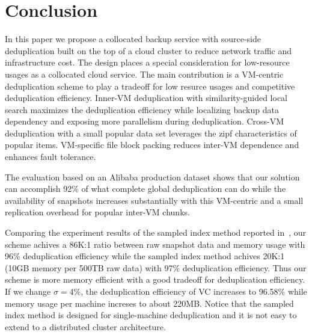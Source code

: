 \section{Conclusion}
\label{sect:final}
In this paper we propose a collocated backup service with source-side deduplication built on
the top of a cloud cluster to reduce network traffic and infrastructure cost.
The design places a special consideration for low-resource usages as a collocated cloud service.
The main contribution is a VM-centric deduplication scheme to play
a tradeoff for low resurce usages and competitive deduplication efficiency. 
Inner-VM deduplication with similarity-guided local search
maximizes the deduplication efficiency while
localizing backup data dependency and exposing more parallelism during deduplication.  
Cross-VM deduplication with a small popular data set leverages the zipf characteristics
of popular items. 
VM-specific file block packing reduces inter-VM dependence and enhances fault tolerance.

The evaluation based on  an  Alibaba  production dataset 
shows that our solution can accomplish 92\% of what complete global
deduplication can do while the availability of snapshots increases substantially with this VM-centric
and a small replication overhead for popular inter-VM chunks.

Comparing the experiment results of the sampled index method reported in~\cite{Guo2011},
our scheme achives a 86K:1 ratio between raw snapshot data and memory usage
with 96\% deduplication efficiency
while the sampled index method achives 20K:1 (10GB memory per 500TB raw data)
with 97\% deduplication efficiency.
Thus our scheme is more memory efficient with a good tradeoff for deduplication efficiency.
If we change $\sigma=4\%$, the deduplication efficiency of VC increases to 96.58\% while
memory usage per machine increses to about 220MB.
Notice that the sampled index method is designed for single-machine deduplication
and it is not easy to extend to a distributed cluster architecture.


